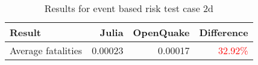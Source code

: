 \begin{table}[htbp]

\centering
\begin{tabular}{ l r r r }

\hline
\rowcolor{anti-flashwhite}
\bf{Result} & \bf{Julia} & \bf{OpenQuake} & \bf{Difference}\\
\hline
Average fatalities & 0.00023 & 0.00017 & \textcolor{red}{32.92\%}\\
\hline
\end{tabular}

\caption{Results for event based risk test case 2d}
\label{tab:result-ebr-2d}
\end{table}